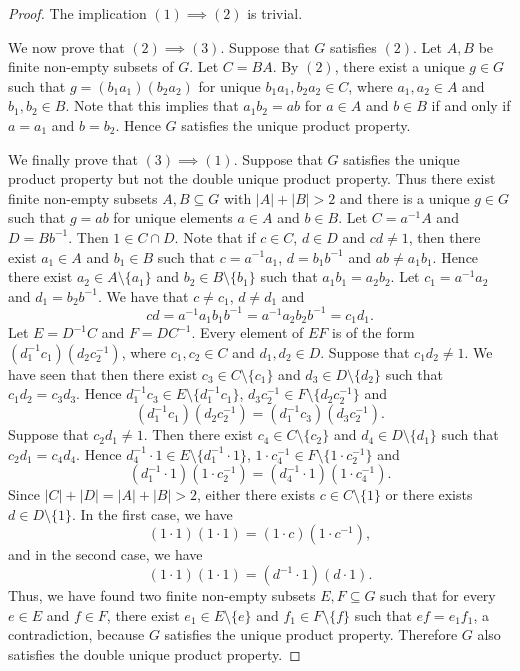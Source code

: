 \begin{proof}
	The implication $(1)\implies(2)$ is trivial.  
	
	We now prove that $(2)\implies(3)$. Suppose that $G$ satisfies $(2)$. Let  $A,B$ be finite non-empty subsets of $G$. Let $C=BA$.  By $(2)$, there exist a unique $g\in G$ such that $g=(b_1a_1)(b_2a_2)$ for unique $b_1a_1,b_2a_2\in C$, where $a_1,a_2\in A$ and $b_1,b_2\in B$. Note that this implies that $a_1b_2=ab$ for $a\in A$ and $b\in B$ if and only if $a=a_1$ and $b=b_2$. Hence $G$ satisfies the unique product property.
	
	We finally prove that $(3)\implies(1)$. Suppose that  $G$ satisfies the unique product property but not the double unique product property. Thus there exist finite non-empty subsets $A,B\subseteq G$ with $|A|+|B|>2$ and there is a unique $g\in G$ such that $g=ab$ for unique elements $a\in A$ and $b\in B$.
	Let $C=a^{-1}A$ and $D=Bb^{-1}$. Then $1\in C\cap D$. Note that if $c\in C$, $d\in D$ and $cd\neq 1$, then there exist $a_1\in A$ and $b_1\in B$ such that $c=a^{-1}a_1$, $d=b_1b^{-1}$ and $ab\neq a_1b_1$. Hence there exist $a_2\in A\setminus\{ a_1\}$ and $b_2\in B\setminus\{ b_1\}$ such that $a_1b_1=a_2b_2$. Let $c_1=a^{-1}a_2$ and $d_1=b_2b^{-1}$. We have that $c\neq c_1$, $d\neq d_1$ and 
	\[ cd=a^{-1}a_1b_1b^{-1}=a^{-1}a_2b_2b^{-1}=c_1d_1.\]
	Let $E=D^{-1}C$ and $F=DC^{-1}$. Every element of $EF$ is of the form $(d_1^{-1}c_1)(d_2c_2^{-1})$, where $c_1,c_2\in C$ and $d_1,d_2\in D$. Suppose that $c_1d_2\ne 1$. We have seen that then there exist $c_3\in C\setminus \{ c_1\}$ and $d_3\in D\setminus\{ d_2\}$ such that $c_1d_2=c_3d_3$. Hence $d_1^{-1}c_3\in E\setminus \{ d_1^{-1}c_1\}$, $d_3c_2^{-1}\in F\setminus\{ d_2c_2^{-1}\}$
	and
	\[ (d_1^{-1}c_1)(d_2c_2^{-1})=(d_1^{-1}c_3)(d_3c_2^{-1}).\]
	Suppose that $c_2d_1\neq 1$. Then there exist $c_4\in C\setminus \{ c_2\}$ and $d_4\in D\setminus\{ d_1\}$ such that $c_2d_1=c_4d_4$. Hence $d_4^{-1}\cdot 1\in E\setminus \{ d_1^{-1}\cdot 1\}$, $1\cdot c_4^{-1}\in F\setminus\{ 1\cdot c_2^{-1}\}$
	and
	\[ (d_1^{-1}\cdot 1)(1\cdot c_2^{-1})=(d_4^{-1}\cdot 1)(1\cdot c_4^{-1}).\]
	Since $|C|+|D|=|A|+|B|>2$, either there exists $c\in C\setminus\{ 1\}$ or there exists $d\in D\setminus\{ 1\}$. In the first case, we have
	\[ (1\cdot 1)(1\cdot 1)=(1\cdot c)(1\cdot c^{-1}),\]
	and in the second case, we have 
		\[ (1\cdot 1)(1\cdot 1)=(d^{-1} \cdot 1)(d\cdot 1).\]
	Thus, we have found two finite non-empty subsets $E,F\subseteq G$ such that for every $e\in E$ and $f\in F$, there exist $e_1\in E\setminus\{ e\}$ and $f_1\in F\setminus\{ f\}$ such that
	$ef=e_1f_1$, a contradiction, because $G$ satisfies the unique product property. Therefore $G$ also satisfies the double unique product property.
\end{proof}

